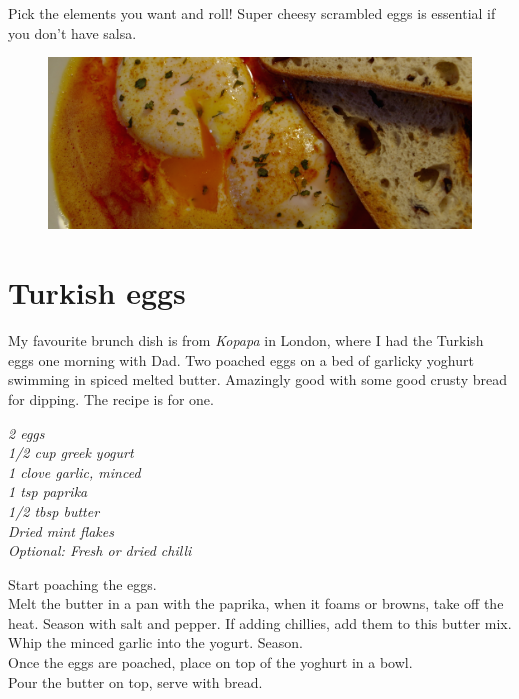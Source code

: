 \documentclass{tufte-book}
\begin{document}
\smallskip
Pick the elements you want and roll! Super cheesy scrambled eggs is essential if you don't have salsa.

\newpage

\begin{figure}[h]
  \includegraphics[width=\linewidth]{turkisheggs.png}
\end{figure}

\section{Turkish eggs}

My favourite brunch dish is from \emph{Kopapa} in London, where I had the Turkish eggs one morning with Dad. Two poached eggs on a bed of garlicky yoghurt swimming in spiced melted butter. Amazingly good with some good crusty bread for dipping. The recipe is for one. 

\smallskip
\emph{2 eggs
\\1/2 cup greek yogurt
\\1 clove garlic, minced
\\1 tsp paprika
\\1/2 tbsp butter
\\Dried mint flakes
\\Optional: Fresh or dried chilli
}

\smallskip
Start poaching the eggs.
\\Melt the butter in a pan with the paprika, when it foams or browns, take off the heat. Season with salt and pepper. If adding chillies, add them to this butter mix.
\\Whip the minced garlic into the yogurt. Season.
\\Once the eggs are poached, place on top of the yoghurt in a bowl.
\\Pour the butter on top, serve with bread.

\newpage
\end{document}

